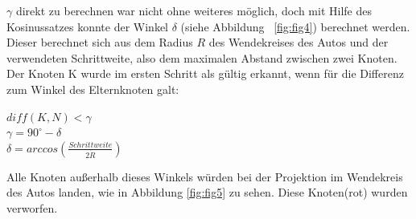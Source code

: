  $\gamma$ direkt zu berechnen war nicht ohne weiteres möglich, doch mit Hilfe des Kosinussatzes konnte der Winkel $\delta$ (siehe Abbildung ~\ref{fig:fig4}) berechnet werden. Dieser berechnet sich aus dem Radius $R$ des Wendekreises des Autos und der verwendeten Schrittweite, also dem maximalen Abstand zwischen zwei Knoten. \\
Der Knoten K wurde im ersten Schritt als gültig erkannt, wenn für die Differenz zum Winkel des Elternknoten galt: 
\begin{center}
$diff(K,N) <\gamma$ \\
$\gamma = 90^{\circ} - \delta$  \\
$\delta = arccos (\frac{Schrittweite}{2 \dot R})$  \\
\end{center}

Alle Knoten außerhalb dieses Winkels würden bei der Projektion im Wendekreis des Autos landen, wie in Abbildung \ref{fig:fig5} zu sehen. Diese Knoten(rot) wurden verworfen.\\
